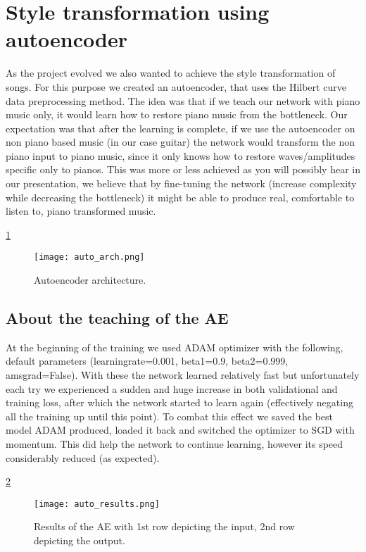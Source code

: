 \section{Style transformation using autoencoder}
As the project evolved we also wanted to achieve the style transformation of songs. For this purpose we created an autoencoder, that uses the Hilbert curve~\cite{hilbert} data preprocessing method. The idea was that if we teach our network with piano music only, it would learn how to restore piano music from the bottleneck. Our expectation was that after the learning is complete, if we use the autoencoder on non piano based music (in our case guitar) the network would transform the non piano input to piano music, since it only knows how to restore waves/amplitudes specific only to pianos. This was more or less achieved as you will possibly hear in our presentation, we believe that by fine-tuning the network (increase complexity while decreasing the bottleneck) it might be able to produce real, comfortable to listen to, piano transformed music.

\ref{fig:auto}
\begin{figure}[H]
	\centering
	\texttt{[image: auto\_arch.png]}
	\caption{Autoencoder architecture.}
	\label{fig:auto}
\end{figure}

\subsection{About the teaching of the AE}
At the beginning of the training we used ADAM optimizer with the following, default parameters (learningrate=0.001, beta1=0.9, beta2=0.999, amsgrad=False). With these the network learned relatively fast but unfortunately each try we experienced a sudden and huge increase in both validational and training loss, after which the network started to learn again (effectively negating all the training up until this point). To combat this effect we saved the best model ADAM produced, loaded it back and switched the optimizer to SGD with momentum. This did help the network to continue learning, however its speed considerably reduced (as expected).

\ref{fig:autores}
\begin{figure}[H]
	\centering
	\texttt{[image: auto\_results.png]}
	\caption{Results of the AE with 1st row depicting the input, 2nd row depicting the output.}
	\label{fig:autores}
\end{figure}
